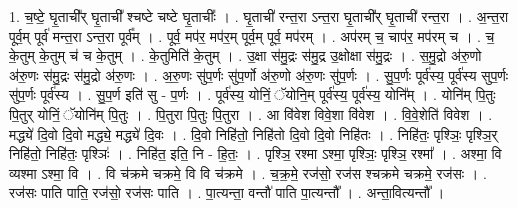 \documentclass[17pt]{extarticle}
\begin{document}
1. च॒ष्टे॒ घृ॒ताची᳚र् घृ॒ताची᳚ श्चष्टे चष्टे घृ॒ताचीः᳚ । . घृ॒ताची॑ रन्त॒रा ऽन्त॒रा घृ॒ताची᳚र् घृ॒ताची॑ रन्त॒रा । . अ॒न्त॒रा पूर्व॒म् पूर्व॑ मन्त॒रा ऽन्त॒रा पूर्व᳚म् । . पूर्व॒ मप॑र॒ मप॑र॒म् पूर्व॒म् पूर्व॒ मप॑रम् । . अप॑रम् च॒ चाप॑र॒ मप॑रम् च । . च॒ के॒तुम् के॒तुम् च॑ च के॒तुम् । . के॒तुमिति॑ के॒तुम् । . उ॒क्षा स॑मु॒द्रः स॑मु॒द्र उ॒क्षोक्षा स॑मु॒द्रः । . स॒मु॒द्रो अ॑रु॒णो अ॑रु॒णः स॑मु॒द्रः स॑मु॒द्रो अ॑रु॒णः । . अ॒रु॒णः सु॑प॒र्णः सु॑प॒र्णो अ॑रु॒णो अ॑रु॒णः सु॑प॒र्णः । . सु॒प॒र्णः पूर्व॑स्य॒ पूर्व॑स्य सुप॒र्णः सु॑प॒र्णः पूर्व॑स्य । . सु॒प॒र्ण इति॑ सु - प॒र्णः । . पूर्व॑स्य॒ योनिं॒ ॅयोनि॒म् पूर्व॑स्य॒ पूर्व॑स्य॒ योनि᳚म् । . योनि॑म् पि॒तुः पि॒तुर् योनिं॒ ॅयोनि॑म् पि॒तुः । . पि॒तुरा पि॒तुः पि॒तुरा । . आ वि॑वेश विवे॒शा वि॑वेश । . वि॒वे॒शेति॑ विवेश । . मद्ध्ये॑ दि॒वो दि॒वो मद्ध्ये॒ मद्ध्ये॑ दि॒वः । . दि॒वो निहि॑तो॒ निहि॑तो दि॒वो दि॒वो निहि॑तः । . निहि॑तः॒ पृश्ञिः॒ पृश्ञि॒र् निहि॑तो॒ निहि॑तः॒ पृश्ञिः॑ । . निहि॑त॒ इति॒ नि - हि॒तः॒ । . पृश्ञि॒ रश्मा ऽश्मा॒ पृश्ञिः॒ पृश्ञि॒ रश्मा᳚ । . अश्मा॒ वि व्यश्मा ऽश्मा॒ वि । . वि च॑क्रमे चक्रमे॒ वि वि च॑क्रमे । . च॒क्र॒मे॒ रज॑सो॒ रज॑स श्चक्रमे चक्रमे॒ रज॑सः । . रज॑सः पाति पाति॒ रज॑सो॒ रज॑सः पाति । . पा॒त्यन्ता॒ वन्तौ॑ पाति पा॒त्यन्तौ᳚ । . अन्ता॒वित्यन्तौ᳚ । \newline
\end{document}
